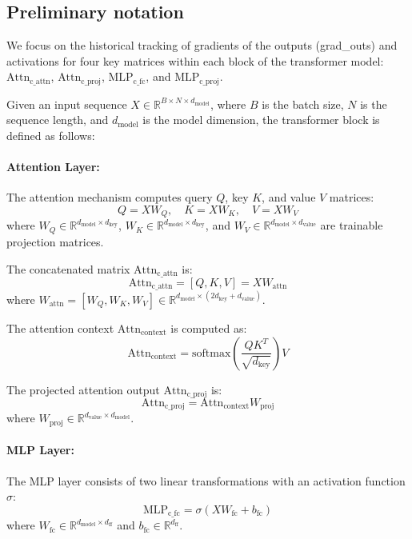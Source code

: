 \subsection{Preliminary notation}

We focus on the historical tracking of gradients of the outputs (grad\_outs) and activations for four key matrices within each block of the transformer model: 
\(\text{Attn}_{\text{c\_attn}}\), \(\text{Attn}_{\text{c\_proj}}\), \(\text{MLP}_{\text{c\_fc}}\), and \(\text{MLP}_{\text{c\_proj}}\).

Given an input sequence \( X \in \mathbb{R}^{B \times N \times d_{\text{model}}} \), where \( B \) is the batch size, \( N \) is the sequence length, and \( d_{\text{model}} \) is the model dimension, the transformer block is defined as follows:


\paragraph{Attention Layer:}
The attention mechanism computes query \( Q \), key \( K \), and value \( V \) matrices:
\[
Q = XW_Q, \quad K = XW_K, \quad V = XW_V
\]
where \( W_Q \in \mathbb{R}^{d_{\text{model}} \times d_{\text{key}}} \), \( W_K \in \mathbb{R}^{d_{\text{model}} \times d_{\text{key}}} \), and \( W_V \in \mathbb{R}^{d_{\text{model}} \times d_{\text{value}}} \) are trainable projection matrices.

The concatenated matrix \(\text{Attn}_{\text{c\_attn}}\) is:
\[
\text{Attn}_{\text{c\_attn}} = [Q, K, V] = XW_{\text{attn}}
\]
where \( W_{\text{attn}} = [W_Q, W_K, W_V] \in \mathbb{R}^{d_{\text{model}} \times (2d_{\text{key}} + d_{\text{value}})} \).

The attention context \(\text{Attn}_{\text{context}}\) is computed as:
\[
\text{Attn}_{\text{context}} = \text{softmax} \left( \frac{QK^T}{\sqrt{d_{\text{key}}}} \right) V
\]

The projected attention output \(\text{Attn}_{\text{c\_proj}}\) is:
\[
\text{Attn}_{\text{c\_proj}} = \text{Attn}_{\text{context}} W_{\text{proj}}
\]
where \( W_{\text{proj}} \in \mathbb{R}^{d_{\text{value}} \times d_{\text{model}}} \).

\paragraph{MLP Layer:}
The MLP layer consists of two linear transformations with an activation function \( \sigma \):
\[
\text{MLP}_{\text{c\_fc}} = \sigma (XW_{\text{fc}} + b_{\text{fc}})
\]
where \( W_{\text{fc}} \in \mathbb{R}^{d_{\text{model}} \times d_{\text{ff}}} \) and \( b_{\text{fc}} \in \mathbb{R}^{d_{\text{ff}}} \).

